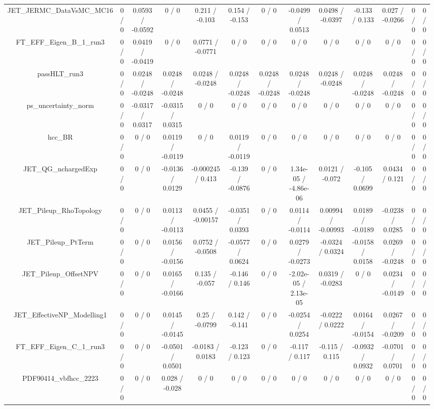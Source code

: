 \documentclass[10pt]{article}
\begin{document}
\begin{table}[htbp]
\begin{center}
\begin{tabular}{|c|c|c|c|c|c|c|c|c|c|c|c|c|}
  JET_JERMC_DataVsMC_MC16 & 0 / 0 & 0.0593 / -0.0592 & 0 / 0 & 0.211 / -0.103 & 0.154 / -0.153 & 0 / 0 & -0.0499 / 0.0513 & 0.0498 / -0.0397 & -0.133 / 0.133 & 0.027 / -0.0266 & 0 / 0 & 0 / 0 \\ 
  FT_EFF_Eigen_B_1_run3 & 0 / 0 & 0.0419 / -0.0419 & 0 / 0 & 0.0771 / -0.0771 & 0 / 0 & 0 / 0 & 0 / 0 & 0 / 0 & 0 / 0 & 0 / 0 & 0 / 0 & 0 / 0 \\ 
  passHLT_run3 & 0 / 0 & 0.0248 / -0.0248 & 0.0248 / -0.0248 & 0.0248 / -0.0248 & 0.0248 / -0.0248 & 0.0248 / -0.0248 & 0.0248 / -0.0248 & 0.0248 / -0.0248 & 0.0248 / -0.0248 & 0.0248 / -0.0248 & 0 / 0 & 0 / 0 \\ 
  ps_uncertainty_norm & 0 / 0 & -0.0317 / 0.0317 & -0.0315 / 0.0315 & 0 / 0 & 0 / 0 & 0 / 0 & 0 / 0 & 0 / 0 & 0 / 0 & 0 / 0 & 0 / 0 & 0 / 0 \\ 
  hcc_BR & 0 / 0 & 0 / 0 & 0.0119 / -0.0119 & 0 / 0 & 0.0119 / -0.0119 & 0 / 0 & 0 / 0 & 0 / 0 & 0 / 0 & 0 / 0 & 0 / 0 & 0 / 0 \\ 
  JET_QG_nchargedExp & 0 / 0 & 0 / 0 & -0.0136 / 0.0129 & -0.000245 / 0.413 & -0.139 / -0.0876 & 0 / 0 & 1.34e-05 / -4.86e-06 & 0.0121 / -0.072 & -0.105 / 0.0699 & 0.0434 / 0.121 & 0 / 0 & 0 / 0 \\ 
  JET_Pileup_RhoTopology & 0 / 0 & 0 / 0 & 0.0113 / -0.0113 & 0.0455 / -0.00157 & -0.0351 / 0.0393 & 0 / 0 & 0.0114 / -0.0114 & 0.00994 / -0.00993 & 0.0189 / -0.0189 & -0.0238 / 0.0285 & 0 / 0 & 0 / 0 \\ 
  JET_Pileup_PtTerm & 0 / 0 & 0 / 0 & 0.0156 / -0.0156 & 0.0752 / -0.0508 & -0.0577 / 0.0624 & 0 / 0 & 0.0279 / -0.0273 & -0.0324 / 0.0324 & -0.0158 / 0.0158 & 0.0269 / -0.0248 & 0 / 0 & 0 / 0 \\ 
  JET_Pileup_OffsetNPV & 0 / 0 & 0 / 0 & 0.0165 / -0.0166 & 0.135 / -0.057 & -0.146 / 0.146 & 0 / 0 & -2.02e-05 / 2.13e-05 & 0.0319 / -0.0283 & 0 / 0 & 0.0234 / -0.0149 & 0 / 0 & 0 / 0 \\ 
  JET_EffectiveNP_Modelling1 & 0 / 0 & 0 / 0 & 0.0145 / -0.0145 & 0.25 / -0.0799 & 0.142 / -0.141 & 0 / 0 & -0.0254 / 0.0254 & -0.0222 / 0.0222 & 0.0164 / -0.0154 & 0.0267 / -0.0209 & 0 / 0 & 0 / 0 \\ 
  FT_EFF_Eigen_C_1_run3 & 0 / 0 & 0 / 0 & -0.0501 / 0.0501 & -0.0183 / 0.0183 & -0.123 / 0.123 & 0 / 0 & -0.117 / 0.117 & -0.115 / 0.115 & -0.0932 / 0.0932 & -0.0701 / 0.0701 & 0 / 0 & 0 / 0 \\ 
  PDF90414_vbfhcc_2223 & 0 / 0 & 0 / 0 & 0.028 / -0.028 & 0 / 0 & 0 / 0 & 0 / 0 & 0 / 0 & 0 / 0 & 0 / 0 & 0 / 0 & 0 / 0 & 0 / 0 \\ 

\end{tabular}
\end{center}
\end{table}
\end{document}
